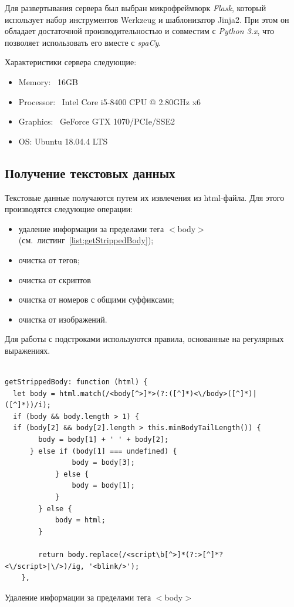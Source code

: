 Для развертывания сервера был выбран микрофреймворк \emph{Flask}, который использует набор инструментов Werkzeug и шаблонизатор Jinja2. При этом он обладает достаточной производительностью и совместим с \emph{Python 3.x}, что позволяет использовать его вместе с \emph{spaCy}.

Характеристики сервера следующие:
\begin{itemize}
  \item Memory: ~16GB
  \item Processor: ~Intel Core i5-8400 CPU @ 2.80GHz x6
  \item Graphics: ~GeForce GTX 1070/PCIe/SSE2
  \item OS: Ubuntu 18.04.4 LTS
\end{itemize}
\newpage
\subsection{Получение текстовых данных}
Текстовые данные получаются путем их извлечения из html-файла. Для этого производятся следующие операции:
\begin{itemize}
  \item удаление информации за пределами тега $<$body$>$ (см.~листинг~\ref{list:getStrippedBody});
  \item очистка от тегов;
  \item очистка от скриптов
  \item очистка от номеров с общими суффиксами;
  \item очистка от изображений.
\end{itemize}

 Для работы с подстроками используются правила, основанные на регулярных выражениях.

\begin{ListingEnv}[h]
\begin{lstlisting}

getStrippedBody: function (html) {
  let body = html.match(/<body[^>]*>(?:([^]*)<\/body>([^]*)|([^]*))/i);
  if (body && body.length > 1) {
  if (body[2] && body[2].length > this.minBodyTailLength()) {
        body = body[1] + ' ' + body[2];
      } else if (body[1] === undefined) {
                body = body[3];
            } else {
                body = body[1];
            }
        } else {
            body = html;
        }

        return body.replace(/<script\b[^>]*(?:>[^]*?<\/script>|\/>)/ig, '<blink/>');
    },
\end{lstlisting}
\caption{Удаление информации за пределами тега $<$body$>$}
\label{list:getStrippedBody}
\end{ListingEnv}



